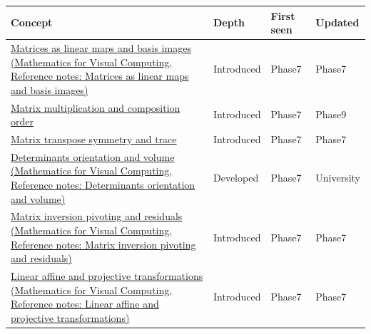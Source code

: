 {\def\LTcaptype{none} %
\begin{longtable}[]{@{}
  >{\raggedright\arraybackslash}p{}
  >{\raggedright\arraybackslash}p{}
  >{\raggedright\arraybackslash}p{}
  >{\raggedright\arraybackslash}p{}@{}}
\toprule\noalign{}
\begin{minipage}[b]{\linewidth}\raggedright
Concept
\end{minipage} & \begin{minipage}[b]{\linewidth}\raggedright
Depth
\end{minipage} & \begin{minipage}[b]{\linewidth}\raggedright
First seen
\end{minipage} & \begin{minipage}[b]{\linewidth}\raggedright
Updated
\end{minipage} \\
\midrule\noalign{}
\endhead
\bottomrule\noalign{}
\endlastfoot
\href{../02-Mathematics-for-Visual-Computing/main.pdf\#nameddest=appendix-bd39c3bf5d64}{Matrices as linear maps and basis images (Mathematics for Visual Computing, Reference notes: Matrices as linear maps and basis images)} & Introduced & Phase7 & Phase7 \\
\hyperref[appendix-ab31ef447dbf]{Matrix multiplication and composition order} & Introduced & Phase7 & Phase9 \\
\hyperref[appendix-175ca5ff874d]{Matrix transpose symmetry and trace} & Introduced & Phase7 & Phase7 \\
\href{../02-Mathematics-for-Visual-Computing/main.pdf\#nameddest=appendix-da478be01d02}{Determinants orientation and volume (Mathematics for Visual Computing, Reference notes: Determinants orientation and volume)} & Developed & Phase7 & University \\
\href{../02-Mathematics-for-Visual-Computing/main.pdf\#nameddest=appendix-48d2e66378ab}{Matrix inversion pivoting and residuals (Mathematics for Visual Computing, Reference notes: Matrix inversion pivoting and residuals)} & Introduced & Phase7 & Phase7 \\
\href{../02-Mathematics-for-Visual-Computing/main.pdf\#nameddest=appendix-0bf0ca73f735}{Linear affine and projective transformations (Mathematics for Visual Computing, Reference notes: Linear affine and projective transformations)} & Introduced & Phase7 & Phase7 \\

\end{longtable}}

